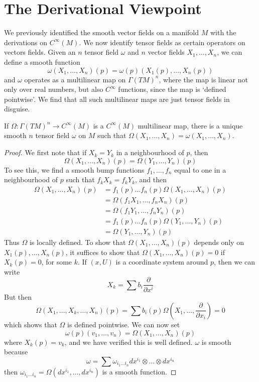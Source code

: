 \section{The Derivational Viewpoint}

We previously identified the smooth vector fields on a manifold $M$ with the derivations on $C^\infty(M)$. We now identify tensor fields as certain operators on vectors fields. Given an $n$ tensor field $\omega$ and $n$ vector fields $X_1, \dots, X_n$, we can define a smooth function
%
\[ \omega(X_1, \dots, X_n)(p) = \omega(p)(X_1(p), \dots, X_n(p)) \]
%
and $\omega$ operates as a multilinear map on $\Gamma(TM)^n$, where the map is linear not only over real numbers, but also $C^\infty$ functions, since the map is `defined pointwise'. We find that all such multilinear maps are just tensor fields in disguise.

\begin{theorem}
    If $\Omega: \Gamma(TM)^n \to C^\infty(M)$ is a $C^\infty(M)$ multilinear map, there is a unique smooth $n$ tensor field $\omega$ on $M$ such that $\Omega(X_1, \dots, X_n) = \omega(X_1, \dots, X_n)$.
\end{theorem}
\begin{proof}
    We first note that if $X_k = Y_k$ in a neighbourhood of $p$, then
    \[ \Omega(X_1, \dots, X_n)(p) = \Omega(Y_1, \dots, Y_n)(p) \]
    To see this, we find a smooth bump functions $f_1, \dots, f_n$ equal to one in a neighbourhood of $p$ such that $f_kX_k = f_kY_k$, and then
    \begin{align*}
        \Omega(X_1, \dots, X_n)(p) &= f_1(p) \dots f_n(p) \Omega(X_1, \dots, X_n)(p)\\
        &= \Omega(f_1X_1, \dots, f_nX_n)(p)\\
        &= \Omega(f_1Y_1, \dots, f_nY_n)(p)\\
        &= f_1(p) \dots f_n(p) \Omega(Y_1, \dots, Y_n)(p)\\
        &= \Omega(Y_1, \dots, Y_n)(p)
    \end{align*}
    Thus $\Omega$ is locally defined. To show that $\Omega(X_1, \dots, X_n)(p)$ depends only on $X_1(p), \dots, X_n(p)$, it suffices to show that $\Omega(X_1, \dots, X_n)(p) = 0$ if $X_k(p) = 0$, for some $k$. If $(x,U)$ is a coordinate system around $p$, then we can write
    \[ X_k = \sum b_i \frac{\partial}{\partial x^i} \]
    But then
    \[ \Omega(X_1, \dots, X_k, \dots, X_n)(p) = \sum b_i(p) \Omega \left(X_1, \dots, \frac{\partial}{\partial x_i} \right) = 0 \]
    which shows that $\Omega$ is defined pointwise. We can now set
    \[ \omega(p)(v_1, \dots, v_n) = \Omega(X_1, \dots, X_n)(p) \]
    where $X_k(p) = v_k$, and we have verified this is well defined. $\omega$ is smooth because
    \[ \omega = \sum \omega_{i_1 \dots i_n} dx^{i_1} \otimes \dots \otimes dx^{i_n} \]
    then $\omega_{i_1 \dots i_n} = \Omega(dx^{i_1}, \dots, dx^{i_n})$ is a smooth function.
\end{proof}

